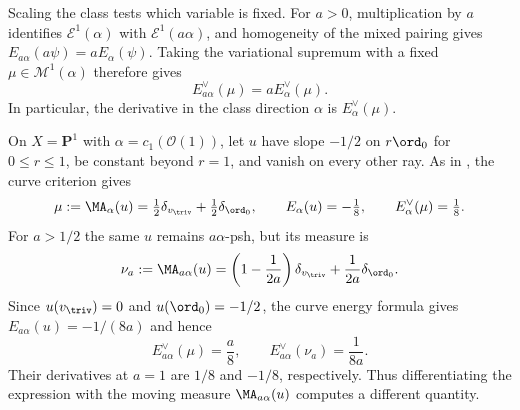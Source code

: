 \begin{example}
\label{ex:mpwn-fixed-measure-variation}
Scaling the class tests which variable is fixed.
For $a>0$, multiplication by $a$ identifies
$\mathcal E^1(\alpha)$ with $\mathcal E^1(a\alpha)$, and
homogeneity of the mixed pairing gives
$E_{a\alpha}(a\psi)=aE_\alpha(\psi)$.
Taking the variational supremum with a fixed
$\mu\in\mathcal M^1(\alpha)$ therefore gives
\[
                       E_{a\alpha}^\vee(\mu)=aE_\alpha^\vee(\mu).
\]
In particular, the derivative in the class direction $\alpha$ is
$E_\alpha^\vee(\mu)$.

On $X=\mathbf P^1$ with $\alpha=c_1(\mathcal O(1))$, let $u$ have
slope $-1/2$ on $r\ord_0$ for $0\leq r\leq1$, be constant
beyond $r=1$, and vanish on every other ray.
As in , the curve criterion gives
\[
 \mu:=\MA_\alpha(u)
       =\tfrac12\delta_{v_{\triv}}+\tfrac12\delta_{\ord_0},
 \qquad E_\alpha(u)=-\tfrac18,\qquad E_\alpha^\vee(\mu)=\tfrac18.
\]
For $a>1/2$ the same $u$ remains $a\alpha$-psh, but its measure is
\[
 \nu_a:=\MA_{a\alpha}(u)
       =\left(1-\frac1{2a}\right)\delta_{v_{\triv}}
                     +\frac1{2a}\delta_{\ord_0}.
\]
Since $u(v_{\triv})=0$ and $u(\ord_0)=-1/2$, the curve energy
formula gives $E_{a\alpha}(u)=-1/(8a)$ and hence
\[
              E_{a\alpha}^\vee(\mu)=\frac a8,
       \qquad E_{a\alpha}^\vee(\nu_a)=\frac1{8a}.
\]
Their derivatives at $a=1$ are $1/8$ and $-1/8$, respectively.
Thus differentiating the expression with the moving measure
$\MA_{a\alpha}(u)$ computes a different quantity.
\end{example}

